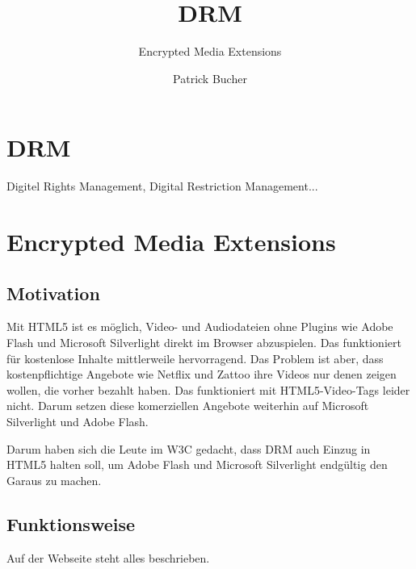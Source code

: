 \documentclass[a4paper,11pt]{scrartcl}
\begin{document}
\title{DRM}
\subtitle{Encrypted Media Extensions}
\author{Patrick Bucher}
\maketitle

\tableofcontents

\section{DRM}

Digitel Rights Management, Digital Restriction Management...

\section{Encrypted Media Extensions}

\subsection{Motivation}

Mit HTML5 ist es möglich, Video- und Audiodateien ohne Plugins wie Adobe Flash und Microsoft Silverlight direkt im Browser abzuspielen. Das funktioniert für kostenlose Inhalte mittlerweile hervorragend. Das Problem ist aber, dass kostenpflichtige Angebote wie Netflix und Zattoo ihre Videos nur denen zeigen wollen, die vorher bezahlt haben. Das funktioniert mit HTML5-Video-Tags leider nicht. Darum setzen diese komerziellen Angebote weiterhin auf Microsoft Silverlight und Adobe Flash.

Darum haben sich die Leute im W3C gedacht, dass DRM auch Einzug in HTML5 halten soll, um Adobe Flash und Microsoft Silverlight endgültig den Garaus zu machen.

\subsection{Funktionsweise}

Auf der Webseite \cite{w3c} steht alles beschrieben.
\end{document}
